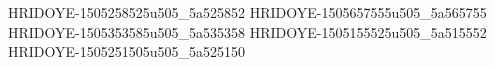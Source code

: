 HRIDOYE-1505258525u505_5a525852
HRIDOYE-1505657555u505_5a565755
HRIDOYE-1505353585u505_5a535358
HRIDOYE-1505155525u505_5a515552
HRIDOYE-1505251505u505_5a525150
